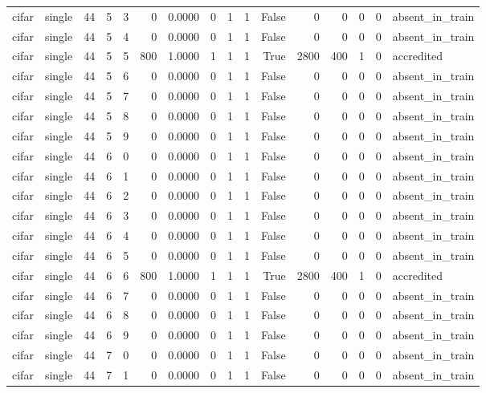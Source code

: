 \begin{tabular}{llrrrrrrrrrrrrrl}
cifar & single & 44 & 5 & 3 & 0 & 0.0000 & 0 & 1 & 1 & False & 0 & 0 & 0 & 0 & absent\_in\_train \\
cifar & single & 44 & 5 & 4 & 0 & 0.0000 & 0 & 1 & 1 & False & 0 & 0 & 0 & 0 & absent\_in\_train \\
cifar & single & 44 & 5 & 5 & 800 & 1.0000 & 1 & 1 & 1 & True & 2800 & 400 & 1 & 0 & accredited \\
cifar & single & 44 & 5 & 6 & 0 & 0.0000 & 0 & 1 & 1 & False & 0 & 0 & 0 & 0 & absent\_in\_train \\
cifar & single & 44 & 5 & 7 & 0 & 0.0000 & 0 & 1 & 1 & False & 0 & 0 & 0 & 0 & absent\_in\_train \\
cifar & single & 44 & 5 & 8 & 0 & 0.0000 & 0 & 1 & 1 & False & 0 & 0 & 0 & 0 & absent\_in\_train \\
cifar & single & 44 & 5 & 9 & 0 & 0.0000 & 0 & 1 & 1 & False & 0 & 0 & 0 & 0 & absent\_in\_train \\
cifar & single & 44 & 6 & 0 & 0 & 0.0000 & 0 & 1 & 1 & False & 0 & 0 & 0 & 0 & absent\_in\_train \\
cifar & single & 44 & 6 & 1 & 0 & 0.0000 & 0 & 1 & 1 & False & 0 & 0 & 0 & 0 & absent\_in\_train \\
cifar & single & 44 & 6 & 2 & 0 & 0.0000 & 0 & 1 & 1 & False & 0 & 0 & 0 & 0 & absent\_in\_train \\
cifar & single & 44 & 6 & 3 & 0 & 0.0000 & 0 & 1 & 1 & False & 0 & 0 & 0 & 0 & absent\_in\_train \\
cifar & single & 44 & 6 & 4 & 0 & 0.0000 & 0 & 1 & 1 & False & 0 & 0 & 0 & 0 & absent\_in\_train \\
cifar & single & 44 & 6 & 5 & 0 & 0.0000 & 0 & 1 & 1 & False & 0 & 0 & 0 & 0 & absent\_in\_train \\
cifar & single & 44 & 6 & 6 & 800 & 1.0000 & 1 & 1 & 1 & True & 2800 & 400 & 1 & 0 & accredited \\
cifar & single & 44 & 6 & 7 & 0 & 0.0000 & 0 & 1 & 1 & False & 0 & 0 & 0 & 0 & absent\_in\_train \\
cifar & single & 44 & 6 & 8 & 0 & 0.0000 & 0 & 1 & 1 & False & 0 & 0 & 0 & 0 & absent\_in\_train \\
cifar & single & 44 & 6 & 9 & 0 & 0.0000 & 0 & 1 & 1 & False & 0 & 0 & 0 & 0 & absent\_in\_train \\
cifar & single & 44 & 7 & 0 & 0 & 0.0000 & 0 & 1 & 1 & False & 0 & 0 & 0 & 0 & absent\_in\_train \\
cifar & single & 44 & 7 & 1 & 0 & 0.0000 & 0 & 1 & 1 & False & 0 & 0 & 0 & 0 & absent\_in\_train \\

\end{tabular}
